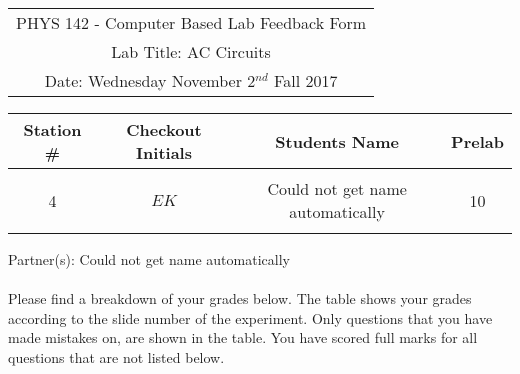 \documentclass{article}
\begin{document}

\clearpage\begin{table}[h]
	\centering
	\begin{tabular}{c}
	PHYS 142 - Computer Based Lab Feedback Form\\
	Lab Title: AC Circuits\\Date: Wednesday November 2$^{nd}$ Fall 2017 \\\hline
\end{tabular}
\end{table}
\begin{table}[h]\centering \begin{tabular}{|c|c|p{9.9 cm}|c|}\hline Station \#  & Checkout Initials & \multicolumn{1}{|c|}{Students Name} & Prelab \\\hline\multirow{3}{*}{4}& \multirow{3}{*}{$EK$} & &\\& &\multicolumn{1}{|c|}{Could not get name automatically}&10\\&   &  &\\\hline
\end{tabular}
\end{table}
Partner(s): Could not get name automatically\\
\\Please find a breakdown of your grades below. The table shows your grades according to the slide number of the experiment. Only questions that you have made mistakes on, are shown in the table. You have scored full marks for all questions that are not listed below.
\end{document}
